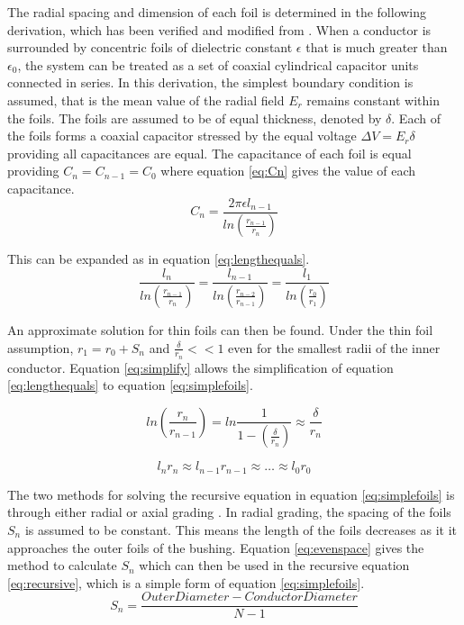The radial spacing and dimension of each foil is determined in the following derivation, which has been verified and modified from \cite{kuffel2000high}.
When a conductor is surrounded by concentric foils of dielectric constant $\epsilon$ that is much greater than $\epsilon_{0}$, the system can be treated as a set of coaxial cylindrical capacitor units connected in series.
In this derivation, the simplest boundary condition is assumed, that is the mean value of the radial field $E_r$ remains constant within the foils.
The foils are assumed to be of equal thickness, denoted by $\delta$.
Each of the foils forms a coaxial capacitor stressed by the equal voltage $\Delta V = E_{r}\delta$ providing all capacitances are equal.
The capacitance of each foil is equal providing $C_n = C_{n-1} = C_0$ where equation \ref{eq:Cn} gives the value of each capacitance.
\begin{equation}
   \label{eq:Cn}
   C_n = \frac{2\pi\epsilon l_{n-1}}{ln(\frac{r_{n-1}}{r_{n}})}
\end{equation}

This can be expanded as in equation \ref{eq:lengthequals}.
\begin{equation}
   \label{eq:lengthequals}
   \frac{l_n}{ln(\frac{r_{n-1}}{r_{n}})} = \frac{l_{n-1}}{ln(\frac{r_{n-2}}{r_{n-1}})} = \frac{l_1}{ln(\frac{r_{0}}{r_{1}})}
\end{equation}

An approximate solution for thin foils can then be found.
Under the thin foil assumption, $r_{1} = r_{0} + S_n$ and $\frac{\delta}{r_n}<<1$ even for the smallest radii of the inner conductor.
Equation \ref{eq:simplify} allows the simplification of equation \ref{eq:lengthequals} to equation \ref{eq:simplefoils}.

\begin{equation}
   \label{eq:simplify}
   ln(\frac{r_n}{r_{n-1}}) = ln\frac{1}{1-(\frac{\delta}{r_n})} \approx \frac{\delta}{r_n}
\end{equation}

\begin{equation}
   \label{eq:simplefoils}
   l_{n}r_{n} \approx l_{n-1}r_{n-1} \approx \dots \approx l_{0}r_{0}
\end{equation}

The two methods for solving the recursive equation in equation \ref{eq:simplefoils} is through either radial or axial grading \cite{Ahmed11}.
In radial grading, the spacing of the foils $S_n$ is assumed to be constant. 
This means the length of the foils decreases as it it approaches the outer foils of the bushing.
Equation \ref{eq:evenspace} gives the method to calculate $S_n$ which can then be used in the recursive equation \ref{eq:recursive}, which is a simple form of equation \ref{eq:simplefoils}.
\begin{equation}
   \label{eq:evenspace}
  S_n = \frac{Outer Diameter - Conductor Diameter}{N-1}
\end{equation}

